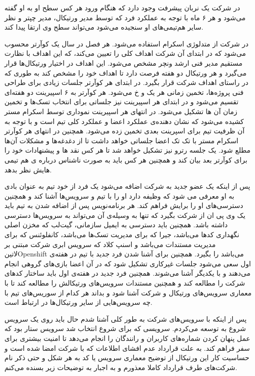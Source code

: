 \documentclass[a4]{report}
\begin{document}
در شرکت یک نربان پیشرفت وجود دارد که هنگام ورود هر کس سطح او به او گفته می‌شود و هر ۶ ماه با توجه به عملکرد فرد که توسط مدیر ورتیکال، مدیر چپتر
و نظر سایر هم‌تیمی‌های او سنجیده می‌شود می‌تواند سطح وی ارتقا پیدا کند.

در شرکت از متدلوژی اسکرام استفاده می‌شود.
هر فصل در سال یک کوآرتر محسوب می‌شود که در ابتدای آن شرکت اهداف کلی را تعیین می‌کند،
که این اهداف با نظارت مستقیم مدیر فنی ارشد ونچر مشخص می‌شود.
این اهداف در اختیار ورتیکال‌ها قرار می‌گیرد و هر ورتیکال دو هفته فرصت دارد تا اهداف خود را مشخص کند به طوری که در راستای اهداف شرکت قرار بگیرد.
در ابتدای هر کوآرتر جلسات زیادی برای طراحی فنی پروژه‌ها، تخمین زمانی هر یک و ‌خ می‌شود.
هر کوآرتر به ۶ اسپیرینت دو هفته‌ای تقسیم می‌شود و در ابتدای هر اسپیرینت نیز جلساتی برای انتخاب تسک‌ها و تخمین زمان آن ها تشکیل می‌شود.
در انتهای هر اسپیرینت نموداری توسط اسکرام مستر کشیده می‌شود که نشان دهنده‌ی عملکرد اعضا و عملکرد کلی تیم است
و با توجه به آن ظرفیت تیم برای اسپرینت بعدی تخمین زده می‌شود.
همچنین در انتهای هر کوآرتر اسکرام مستر با تک تک اعضا جلساتی خواهد داشت تا از دغدغه‌ها و مشکلات آن‌ها مطلع شود.
یک جلسه رترو نیز تشکیل خواهد شد تا هر کس نقد ها و پیشنهادات خود را برای کوآرتر بعد بیان کند و
همچنین هر کس باید به صورت ناشناس درباره ی هم تیمی هایش نظر بدهد.

پس از اینکه یک عضو جدید به شرکت اضافه می‌شود یک فرد از خود تیم به عنوان بادی به او معرفی می شود
که وظیفه دارد او را با تیم و سرویس‌ها آشنا کند و همچنین دسترسی‌های او را برایش فراهم کند.
هر برنامه‌نویس پس از اضافه شدن به تیم باید یک وی پی ان از شرکت بگیرد که تنها به وسیله‌ی آن می‌تواند به سرویس‌ها دسترسی داشته باشد.
همچنین باید دسترسی به ایمیل سازمانی، گیت‌لب که مخزن اصلی نگهداری کدها می‌باشد،
جیرا که برای مدیریت تسک‌ها می‌باشد،
کانفلوئنس که برای مدیریت مستندات می‌باشد
و اسنپ کلاد که سرویس ابری شرکت مبتنی بر ‌لاتین{Openshift} می‌باشد
را بگیرد.
همچنین برای آشنا شدن فرد جدید با تیم در هفته‌ی اول سعی می‌شود جلسات غیرکاری تشکیل شود که در آن اعضا بازی‌های گروهی انجام می‌دهند
و با یکدیگر آشنا می‌شوند.
همچنین فرد جدید در هفته‌ی اول باید ساختار کد‌های شرکت را مطالعه کند
و همچنین مستندات سرویس‌های ورتیکالش را مطالعه کند
تا با معماری سرویس‌های ورتیکال و شرکت آشنا شود
و بداند هر کدام از سوریس‌های تیم با چه سرویس‌هایی از سایر ورتیکال‌ها در ارتباط است.


پس از اینکه با سرویس‌های شرکت به طور کلی آشنا شدم حال باید روی یک سرویس شروع به توسعه می‌کردم.
سرویسی که برای شروع انتخاب شد سرویس ستار بود که عمل پنهان کردن شماره‌های کاربران و رانندگان را انجام می‌دهد تا امنیت بیشتری برای سفر فراهم کند.
به علت قرارداد عدم افشای اطلاعات که با شرکت امضا شده است و حساسیت کار این ورتیکال از توضیح معماری سرویس یا کد به هر شکل و حتی ذکر نام شرکت‌های
طرف قرارداد کاملا معذورم و به اجبار به توضیحات زیر بسنده می‌کنم.
\end{document}
